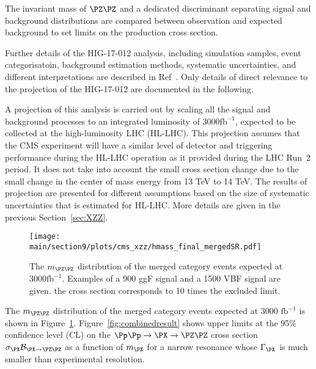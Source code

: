 The invariant mass of $\PZ \PZ$ and a dedicated discriminant separating signal and background distributions are compared between observation and expected background to set limits on the production cross section. 

Further details of the HIG-17-012 analysis, including simulation samples, event categorisatoin, background estimation methods, systematic uncertainties, and different interpretations are described in Ref~\cite{Sirunyan:2018qlb}. Only details of direct relevance to the projection of the HIG-17-012 are documented in the following.


A projection of this analysis is carried out by scaling all the signal
and background processes to an integrated luminosity of 3000$\mathrm{fb}^{-1}$, expected to be collected at the high-luminosity LHC (HL-LHC). This projection assumes that the CMS experiment will have a similar level of detector and triggering performance during the HL-LHC operation as it provided during the LHC Run~2 period. It does not take into account the small cross section change due to the small change in the center of mass energy from 13 TeV to 14 TeV. The results of projection are presented for different assumptions based on the size of systematic uncertainties that is estimated for HL-LHC. More details are given in the previous Section~\ref{sec:XZZ}.

\begin{figure}[htbp]
        \centering
                \texttt{[image: \\main/section9/plots/cms\_xzz/hmass\_final\_mergedSR.pdf]}
                \caption{The $m_{\PZ\PZ}$ distribution of the merged category events expected at 3000$\mathrm{fb}^{-1}$. Examples of a 900 \UGeV ggF signal and a 1500 \UGeV VBF signal are given. the cross section corresponds to 10 times the excluded limit. 
        \label{fig:mzz}
        }
            \end{figure}
The $m_{\PZ\PZ}$ distribution of the merged category events expected at 3000 $\mathrm{fb}^{-1}$ is shown in Figure~\ref{fig:mzz}. Figure~\ref{fig:combinedresult} shows upper limits at the 95\% confidence level (CL) on the $\Pp\Pp\to\PX\to\PZ\PZ$ cross section
$\sigma_{\PX} \mathcal{B}_{{\PX}\to\PZ\PZ}$ as a function of $m_\PX$ for a narrow resonance whose $\Gamma_\PX$ is much smaller than experimental resolution.

